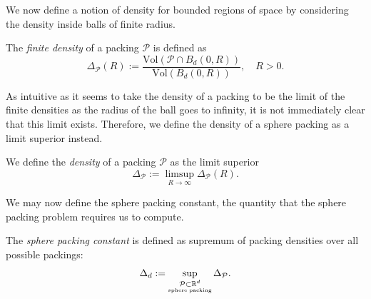 We now define a notion of density for bounded regions of space by considering the density inside balls of finite radius.

\begin{definition}\label{SpherePacking.finiteDensity}\leanok
  The \emph{finite density} of a packing $\mathcal{P}$ is defined as
  \[
    \Delta_{\mathcal{P}}(R):=\frac{\mathrm{Vol}(\mathcal{P}\cap B_d(0,R))}{\mathrm{Vol}(B_d(0,R))},\quad R>0.
  \]
\end{definition}

As intuitive as it seems to take the density of a packing to be the limit of the finite densities as the radius of the ball goes to infinity, it is not immediately clear that this limit exists. Therefore, we define the density of a sphere packing as a limit superior instead.

\begin{definition}\label{SpherePacking.density}\leanok
  We define the \emph{density} of a packing $\mathcal{P}$ as the limit superior
  \[
    \Delta_{\mathcal{P}}:=\limsup\limits_{R\to\infty}\Delta_{\mathcal{P}}(R).
  \]
\end{definition}

We may now define the sphere packing constant, the quantity that the sphere packing problem requires us to compute.

\begin{definition}\label{SpherePackingConstant}\leanok
  The \emph{sphere packing constant} is defined as supremum of packing densities over all possible packings:
  \[
    \Delta_d:=\sup\limits_{\substack{\mathcal{P}\subset\mathbb{R}^d\\ \scriptscriptstyle\mathrm{sphere}\;\mathrm{packing}}}\Delta_{\mathcal{P}}.
  \]
\end{definition}

